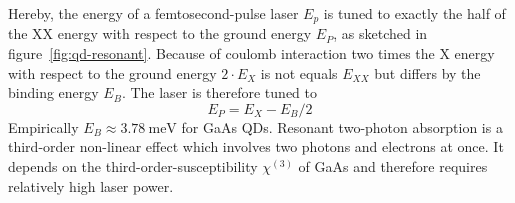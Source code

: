 Hereby, the energy of a femtosecond-pulse laser $E_p$ is tuned to exactly the half of the \ac{XX} energy with respect to the ground energy $E_{P}$, as sketched in figure~\ref{fig:qd-resonant}.
Because of coulomb interaction two times the \ac{X} energy with respect to the ground energy $2 \cdot E_X$ is not equals $E_{XX}$ but differs by the binding energy $E_B$.
The laser is therefore tuned to 
\begin{equation}
E_P = E_X - E_B / 2
\end{equation}
Empirically $E_B \approx \SI{3.78}{\milli \electronvolt}$ for \ac{GaAs} \acp{QD}.
Resonant two-photon absorption is a third-order non-linear effect which involves two photons and electrons at once.
It depends on the third-order-susceptibility $\chi^{(3)}$ of \ac{GaAs} and therefore requires relatively high laser power.

